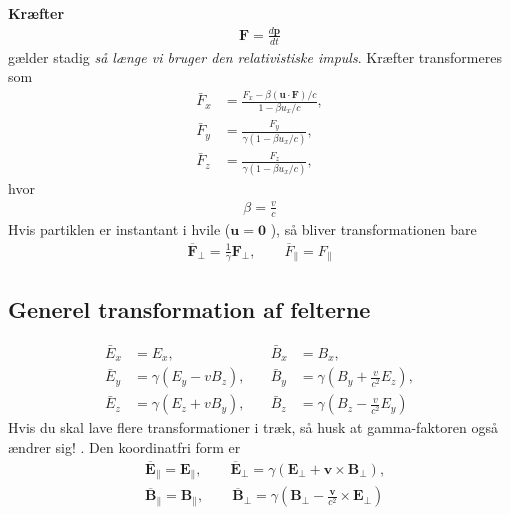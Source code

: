 \documentclass[a4paper]{article}
\begin{document}
    \textbf{Kræfter}
    \begin{align*}
        \boxed{\mathbf{F} = \frac{d \mathbf{p}}{dt}} \tag{12.60}
    \end{align*}
    gælder stadig \textit{så længe vi bruger den relativistiske impuls}. Kræfter transformeres som
    \begin{align*}
        \bar{F}_x &= \frac{F_x - \beta (\mathbf{u} \cdot \mathbf{F}) / c}{1 - \beta u_x/ c}, \tag{12.67} \\
        \bar{F}_y &= \frac{F_y}{\gamma \left( 1 - \beta u_x / c \right)}, \tag{12.66} \\
        \bar{F}_z &= \frac{F_z}{\gamma \left( 1 - \beta u_x / c \right)},
    \end{align*}
    hvor \begin{align*}
        \beta = \frac{v}{c}
    \end{align*}
    Hvis partiklen er instantant i hvile (\(\mathbf{u} = \mathbf{0}\) ), så bliver transformationen bare\begin{align*}
        \overline{\mathbf{F}}_\perp = \frac{1}{\gamma } \mathbf{F}_\perp, \qquad \overline{F}_\parallel = F_\parallel \tag{12.68}
    \end{align*}

    \subsection{Generel transformation af felterne}
    \begin{align*}
        \bar{E}_x &= E_x, \quad & \bar{B}_x &= B_x, \\
        \bar{E}_y &= \gamma \left( E_y - v B_z \right), \quad & \bar{B}_y &= \gamma \left( B_y + \frac{v}{c^2} E_z \right), \\
        \bar{E}_z &= \gamma \left( E_z + v B_y \right), \quad & \bar{B}_z &= \gamma \left( B_z - \frac{v}{c^2} E_y \right)\tag{12.111}
    \end{align*}
    Hvis du skal lave flere transformationer i træk, så husk at gamma-faktoren også ændrer sig! . Den koordinatfri form er \begin{align*}
        &\overline{\mathbf{E}}_{\parallel} =\mathbf{E}_{\parallel}, \qquad \overline{\mathbf{E}}_\perp = \gamma (\mathbf{E}_{\perp} + \mathbf{v} \times \mathbf{B}_\perp),\\
        &\overline{\mathbf{B}}_{\parallel} =\mathbf{B}_{\parallel}, \qquad \overline{\mathbf{B}}_\perp = \gamma (\mathbf{B}_{\perp} - \frac{\mathbf{v}}{c^{2} } \times \mathbf{E}_\perp) \tag{12.112}
    \end{align*}
\end{document}
